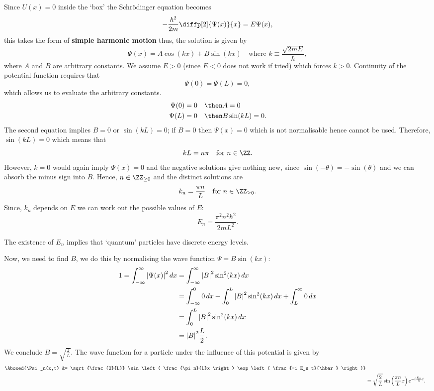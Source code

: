 \documentclass[12pt, a4paper]{article}
\begin{document}
Since \(U(x)=0\) inside the `box' the Schrödinger equation becomes
\[-\frac{\hbar^2}{2m} \diffp[2]{\Psi(x)}{x} = E\Psi(x),\]
this takes the form of \textbf{simple harmonic motion} thus, the solution is given by 
\[\Psi(x) = A \cos(kx)+B\sin(kx) \quad \text{where } k \equiv \frac{\sqrt{2mE}}{\hbar},\]
where \(A\) and \(B\) are arbitrary constants. We assume \(E >0\) (since \(E<0\) does not work if tried) which forces \(k>0\). Continuity of the potential function requires that 
\[\Psi(0) = \Psi(L) = 0,\]
which allows us to evaluate the arbitrary constants.
\[\begin{aligned}
    \Psi(0) &= 0 \quad \then A =0 \\
    \Psi(L) &= 0 \quad \then B\sin(kL)=0.
\end{aligned}\]
The second equation implies \(B = 0\) or \(\sin(kL)=0\); if \(B=0\) then \(\Psi(x)=0\) which is not normalisable hence cannot be used. Therefore, \(\sin(kL) = 0\) which means that 
\[kL = n \pi \quad \text{for } n \in \ZZ.\]
However, \(k=0\) would again imply \(\Psi(x)=0\) and the negative solutions give nothing new, since \(\sin(-\theta)=-\sin(\theta)\) and we can absorb the minus sign into \(B\). Hence, \(n \in \ZZ_{\geq 0}\) and the distinct solutions are 
\[k_n = \frac{\pi n}{L} \quad \text{for } n \in \ZZ_{\geq 0}.\]
Since, \(k_n\) depends on \(E\) we can work out the possible values of \(E\):
\[\boxed{E_n = \frac{\pi^2 n^2 \hbar^2}{2mL^2}.}\]

\begin{mdnote}
    The existence of \(E_n\) implies that `quantum' particles have discrete energy levels.
\end{mdnote}

Now, we need to find \(B\), we do this by normalising the wave function \(\Psi = B \sin(kx)\):
\[\begin{aligned}
    1= \int_{-\infty}^{\infty} \abs{\Psi(x)}^2 \, dx &= \int_{-\infty}^{\infty} \abs{B}^2 \sin^2(kx) \, dx \\
    &= \int_{-\infty}^{0} 0 \, dx + \int_{0}^{L} \abs{B}^2 \sin^2(kx) \, dx + \int_{L}^{\infty} 0 \, dx \\
    &= \int_{0}^{L} \abs{B}^2 \sin^2(kx) \, dx \\
    &= \abs{B}^2 \frac{L}{2}.
\end{aligned}\]
We conclude \(B = \sqrt{\frac{2}{L}}\). The wave function for a particle under the influence of this potential is given by 
\[\begin{aligned}
    \Aboxed{\Psi_n(x,t) &= \sqrt{\frac{2}{L}} \sin\left( \frac{\pi n}{L}x \right) \exp\left( \frac{-i E_n t}{\hbar} \right)} \\
    &= \sqrt{\frac{2}{L}} \sin\left( \frac{\pi n}{L}x \right) e^{-i\frac{E_n}{\hbar}t}.
\end{aligned}\]
\end{document}
